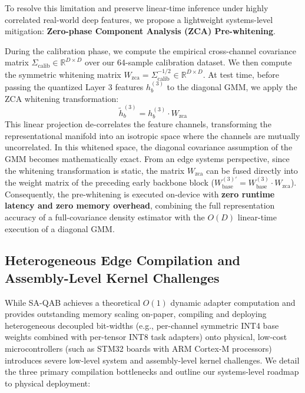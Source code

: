 \documentclass{article}
\theoremstyle{plain}
\theoremstyle{definition}
\theoremstyle{remark}
\begin{document}
To resolve this limitation and preserve linear-time inference under highly correlated real-world deep features, we propose a lightweight systems-level mitigation: \textbf{Zero-phase Component Analysis (ZCA) Pre-whitening}.

During the calibration phase, we compute the empirical cross-channel covariance matrix $\Sigma_{\text{calib}} \in \mathbb{R}^{D \times D}$ over our 64-sample calibration dataset. We then compute the symmetric whitening matrix $W_{\text{zca}} = \Sigma_{\text{calib}}^{-1/2} \in \mathbb{R}^{D \times D}$. At test time, before passing the quantized Layer 3 features $h_b^{(3)}$ to the diagonal GMM, we apply the ZCA whitening transformation:
\begin{equation}
    \tilde{h}_b^{(3)} = h_b^{(3)} \cdot W_{\text{zca}}
\end{equation}
This linear projection de-correlates the feature channels, transforming the representational manifold into an isotropic space where the channels are mutually uncorrelated. In this whitened space, the diagonal covariance assumption of the GMM becomes mathematically exact. From an edge systems perspective, since the whitening transformation is static, the matrix $W_{\text{zca}}$ can be fused directly into the weight matrix of the preceding early backbone block ($W_{\text{base}}^{(3)'} = W_{\text{base}}^{(3)} \cdot W_{\text{zca}}$). Consequently, the pre-whitening is executed on-device with \textbf{zero runtime latency and zero memory overhead}, combining the full representation accuracy of a full-covariance density estimator with the $O(D)$ linear-time execution of a diagonal GMM.

\subsection{Heterogeneous Edge Compilation and Assembly-Level Kernel Challenges}
\label{sec:appendix_compilation}
While SA-QAB achieves a theoretical $O(1)$ dynamic adapter computation and provides outstanding memory scaling on-paper, compiling and deploying heterogeneous decoupled bit-widths (e.g., per-channel symmetric INT4 base weights combined with per-tensor INT8 task adapters) onto physical, low-cost microcontrollers (such as STM32 boards with ARM Cortex-M processors) introduces severe low-level system and assembly-level kernel challenges. We detail the three primary compilation bottlenecks and outline our systems-level roadmap to physical deployment:
\end{document}
